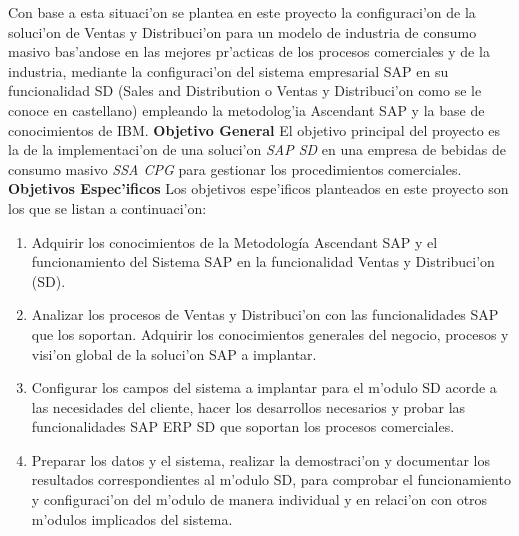 		Con base a esta situaci'on se plantea en este proyecto la configuraci'on de la soluci'on de Ventas y Distribuci'on para un modelo de industria de consumo masivo bas'andose en las mejores pr'acticas de los procesos comerciales y de la industria, mediante la configuraci'on del sistema empresarial SAP en su funcionalidad SD (Sales and Distribution o Ventas y Distribuci'on como se le conoce en castellano) empleando la metodolog'ia Ascendant SAP y la base de conocimientos de IBM.
\newline
\newline
\label{sect:objetivo_general}
\newline
\textbf{Objetivo General}
\newline
\newline
\indent El objetivo principal del proyecto es la de la implementaci'on de una soluci'on \emph{SAP SD} en una empresa de bebidas de consumo masivo \emph{SSA CPG} para gestionar los procedimientos comerciales. 
\newline
\newline
\label{sect:objetivos_especificos}
\textbf{Objetivos Espec'ificos}
\newline
\newline
 Los objetivos espe'ificos planteados en este proyecto son los que se listan a continuaci'on:
\begin{enumerate}
\item Adquirir los conocimientos de la Metodología Ascendant SAP y el funcionamiento del Sistema SAP en la funcionalidad Ventas y Distribuci'on (SD).

\item Analizar los procesos de Ventas y Distribuci'on con las funcionalidades SAP que los soportan. Adquirir los conocimientos generales del negocio, procesos y visi'on global de la soluci'on SAP a implantar.

\item Configurar los campos del sistema a implantar para el m'odulo SD acorde a las necesidades del cliente, hacer los desarrollos necesarios y probar las funcionalidades SAP ERP SD que soportan los procesos comerciales.

\item Preparar los datos y el sistema, realizar la demostraci'on y documentar los resultados correspondientes al m'odulo SD, para comprobar el funcionamiento y configuraci'on del m'odulo de manera individual y en relaci'on con otros m'odulos implicados del sistema.

\end{enumerate}




